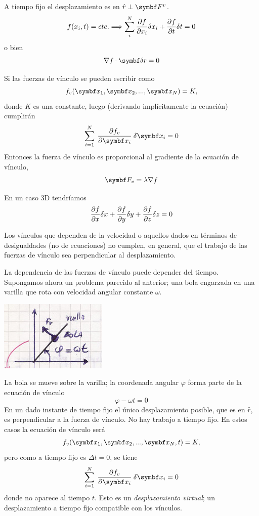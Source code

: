\documentclass[10pt,oneside]{CBFT_book}
\begin{document}
A tiempo fijo el desplazamiento es en $\hat{r} \perp \vb{F}^v$.
\[
	f(x_i,t) = cte. \Longrightarrow \sum_i^N \frac{\partial^{\hspace{-0.05em}} {f}}{\partial {x_i}^{\hspace{-0.05em}}} \delta x_i + \frac{\partial^{\hspace{-0.05em}} {f}}{\partial {t}^{\hspace{-0.05em}}} \delta t = 0
\]
o bien
\[
	\nabla f \cdot \vb{\delta r} = 0
\]

Si las fuerzas de vínculo se pueden escribir como
\[
	f_v(\vb{x}_1, \vb{x}_2, ..., \vb{x}_N ) = K,
\]
donde $K$ es una constante, luego (derivando implícitamente la ecuación) cumplirán
\[
	\sum_{i=1}^N \: \dpar{f_v}{\vb{x}_i}\:\delta{\vb{x}_i} = 0
\]
Entonces la fuerza de vínculo es proporcional al gradiente de la ecuación de vínculo,
\[
	\vb{F}_v = \lambda \nabla f
\]

En un caso 3D tendríamos
\[
	\frac{\partial^{\hspace{-0.05em}} {f}}{\partial {x}^{\hspace{-0.05em}}}\delta x + \frac{\partial^{\hspace{-0.05em}} {f}}{\partial {y}^{\hspace{-0.05em}}}\delta y + \frac{\partial^{\hspace{-0.05em}} {f}}{\partial {z}^{\hspace{-0.05em}}}\delta z = 0
\]

Los vínculos que dependen de la velocidad o aquellos dados en términos de desigualdades (no de ecuaciones) no cumplen,
en general, que el trabajo de las fuerzas de vínculo sea perpendicular al desplazamiento.

La dependencia de las fuerzas de vínculo puede depender del tiempo. Supongamos ahora un problema parecido al anterior;
una bola engarzada en una varilla que rota con velocidad angular constante $\omega$.

\includegraphics[scale=0.4]{images/fig_mc_bola_varilla_rotante.jpg}

La bola se mueve sobre la varilla; la coordenada angular $\varphi$ forma parte de la ecuación de vínculo
\[
	\varphi - \omega t = 0
\]
En un dado instante de tiempo fijo el único desplazamiento posible, que es en $\hat{r}$, es perpendicular a la fuerza
de vínculo. No hay trabajo a tiempo fijo.
En estos casos la ecuación de vínculo será
\[
	f_v(\vb{x}_1, \vb{x}_2, ..., \vb{x}_N, t ) = K,
\]
pero como a tiempo fijo es $\Delta t=0$, se tiene
\[
	\sum_{i=1}^N \: \dpar{f_v}{\vb{x}_i}\:\delta{\vb{x}_i} = 0
\]
donde no aparece al tiempo $t$.
Esto es un {\it desplazamiento virtual}; un desplazamiento a tiempo fijo compatible con los vínculos.
\end{document}
